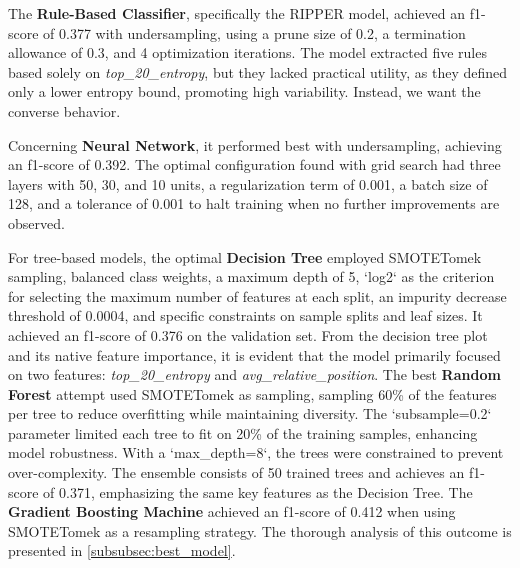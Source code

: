 The \textbf{Rule-Based Classifier}, specifically the RIPPER model, achieved an f1-score of 0.377 with undersampling, using a prune size of 0.2, a termination allowance of 0.3, and 4 optimization iterations. The model extracted five rules based solely on \textit{top\_20\_entropy}, but they lacked practical utility, as they defined only a lower entropy bound, promoting high variability. Instead, we want the converse behavior.  

Concerning \textbf{Neural Network}, it performed best with undersampling, achieving an f1-score of 0.392. The optimal configuration found with grid search had three layers with 50, 30, and 10 units, a regularization term of 0.001, a batch size of 128, and a tolerance of 0.001 to halt training when no further improvements are observed.

For tree-based models, the optimal \textbf{Decision Tree} employed SMOTETomek sampling, balanced class weights, a maximum depth of 5, `log2` as the criterion for selecting the maximum number of features at each split, an impurity decrease threshold of 0.0004, and specific constraints on sample splits and leaf sizes. It achieved an f1-score of 0.376 on the validation set. From the decision tree plot and its native feature importance, it is evident that the model primarily focused on two features: \textit{top\_20\_entropy} and \textit{avg\_relative\_position}.  
The best \textbf{Random Forest} attempt used SMOTETomek as sampling, sampling 60\% of the features per tree to reduce overfitting while maintaining diversity. The `subsample=0.2` parameter limited each tree to fit on 20\% of the training samples, enhancing model robustness. With a `max\_depth=8`, the trees were constrained to prevent over-complexity. The ensemble consists of 50 trained trees and achieves an f1-score of 0.371, emphasizing the same key features as the Decision Tree.  
The \textbf{Gradient Boosting Machine} achieved an f1-score of 0.412 when using SMOTETomek as a resampling strategy. The thorough analysis of this outcome is presented in \autoref{subsubsec:best_model}.


